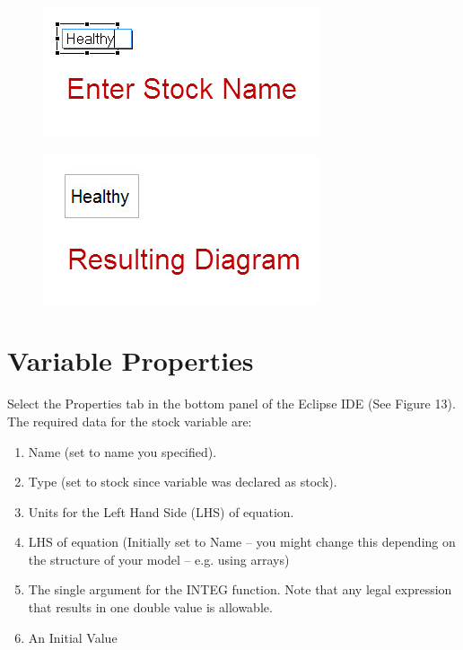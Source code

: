 \documentclass[11pt]{amsart}
\begin{document}
\begin{figure}[ht]
\begin{center}
\vspace{.2in}
\centerline {
\includegraphics[totalheight=0.15\textheight]{images/011.jpg}
}
\caption{}
\label{fig:011}
\end{center}
\end{figure}




\begin{figure}[ht]
\begin{center}
\vspace{.2in}
\centerline {
\includegraphics[totalheight=0.15\textheight]{images/012.jpg}
}
\caption{}
\label{fig:012}
\end{center}
\end{figure}

\clearpage

\section{Variable Properties}
Select the Properties tab in the bottom panel of the Eclipse IDE (See Figure 13). The required data for the stock variable are:

\begin{enumerate}
\item Name (set to name you specified).
\item Type (set to stock since variable was declared as stock).
\item Units for the Left Hand Side (LHS) of equation.
\item LHS of equation (Initially set to Name – you might change this depending on the structure of your model – e.g. using arrays)
\item The single argument for the INTEG function. Note that any legal expression that results in one double value is allowable.
\item An Initial Value
\end{enumerate}
\vspace{.2in}
\end{document}
